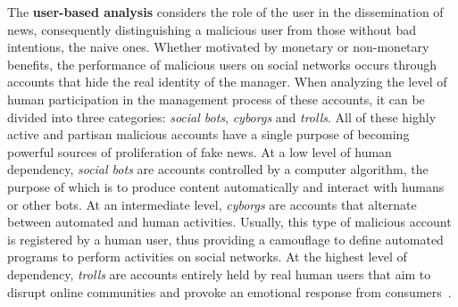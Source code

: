 \documentclass{ieeeaccess}
\begin{document}


The \textbf{user-based analysis} considers the role of the user in the dissemination of news, consequently distinguishing a malicious user from those without bad intentions, the naive ones. Whether motivated by monetary or non-monetary benefits, the performance of malicious users on social networks occurs through accounts that hide the real identity of the manager. When analyzing the level of human participation in the management process of these accounts, it can be divided into three categories: \textit{social bots}, \textit{cyborgs} and \textit{trolls}. All of these highly active and partisan malicious accounts have a single purpose of becoming powerful sources of proliferation of fake news. At a low level of human dependency, \textit{social bots} are accounts controlled by a computer algorithm, the purpose of which is to produce content automatically and interact with humans or other bots. At an intermediate level, \textit{cyborgs} are accounts that alternate between automated and human activities. Usually, this type of malicious account is registered by a human user, thus providing a camouflage to define automated programs to perform activities on social networks. At the highest level of dependency, \textit{trolls} are accounts entirely held by real human users that aim to disrupt online communities and provoke an emotional response from consumers~\cite{shu2017fake}.
\end{document}
